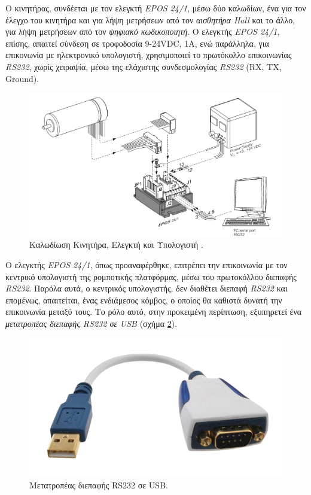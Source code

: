 Ο κινητήρας, συνδέεται με τον ελεγκτή \textit{EPOS 24/1}, μέσω δύο καλωδίων, ένα για τον έλεγχο του κινητήρα και για λήψη μετρήσεων από τον \textit{αισθητήρα Hall} και το άλλο, για λήψη μετρήσεων από τον \textit{ψηφιακό κωδικοποιητή}. Ο ελεγκτής \textit{EPOS 24/1}, επίσης, απαιτεί σύνδεση σε τροφοδοσία 9-24VDC, 1Α, ενώ παράλληλα, για επικονωνία με ηλεκτρονικό υπολογιστή, χρησιμοποιεί το πρωτόκολλο επικοινωνίας \textit{RS232}, χωρίς χειραψία, μέσω της ελάχιστης συνδεσμολογίας \textit{RS232} (RX, TX, Ground).

\begin{figure}[!ht]
		\centering
		\includegraphics[width=0.7\linewidth]{Chapters/Chapter2/Figures/motor_minimum_wiring.png}
		\caption[Καλωδίωση Κινητήρα, Ελεγκτή και Υπολογιστή.]{Καλωδίωση Κινητήρα, Ελεγκτή και Υπολογιστή \cite{epos241_manual}.}
		\label{fig:motor_minimum_wiring}
\end{figure}

O ελεγκτής \textit{EPOS 24/1}, όπως προαναφέρθηκε, επιτρέπει την επικοινωνία με τον κεντρικό υπολογιστή της ρομποτικής πλατφόρμας, μέσω του πρωτοκόλλου διεπαφής \textit{RS232}. Παρόλα αυτά, ο κεντρικός υπολογιστής, δεν διαθέτει διεπαφή \textit{RS232} και επομένως, απαιτείται, ένας ενδιάμεσος κόμβος, ο οποίος θα καθιστά δυνατή την επικοινωνία μεταξύ τους. Το ρόλο αυτό, στην προκειμένη περίπτωση, εξυπηρετεί ένα \textit{μετατροπέας διεπαφής RS232 σε USB} (σχήμα \ref{fig:rs232_to_usb_adapter}).

\begin{figure}[!ht]
		\centering
		\includegraphics[width=.35\linewidth]{Chapters/Chapter2/Figures/rs232_to_usb_adapter.png}
		\caption{Μετατροπέας διεπαφής RS232 σε USB.}
		\label{fig:rs232_to_usb_adapter}
\end{figure}


